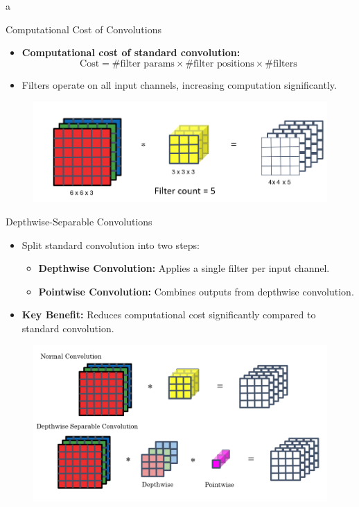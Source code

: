 a\documentclass[10pt]{beamer}
\theoremstyle{remark}
\theoremstyle{definition}
\begin{document}
\begin{frame}{Computational Cost of Convolutions}
\begin{itemize}
    \item \textbf{Computational cost of standard convolution:}
    \[
    \text{Cost} = \text{\# filter params} \times \text{\# filter positions} \times \text{\# filters}
    \]
    \item Filters operate on all input channels, increasing computation significantly.
\end{itemize}
\begin{figure}
    \centering
    \includegraphics[width=0.8\linewidth]{./images/NormalConv_MobileNet.png} 
\end{figure}
\end{frame}

\begin{frame}{Depthwise-Separable Convolutions}
\begin{itemize}
    \item Split standard convolution into two steps:
    \begin{itemize}
        \item \textbf{Depthwise Convolution:} Applies a single filter per input channel.
        \item \textbf{Pointwise Convolution:} Combines outputs from depthwise convolution.
    \end{itemize}
    \item \textbf{Key Benefit:} Reduces computational cost significantly compared to standard convolution.
\end{itemize}
\begin{figure}
    \centering
    \includegraphics[width=0.8\linewidth]{./images/Depth_vs_Normal_Conv.png} 
\end{figure}
\end{frame}
\end{document}
